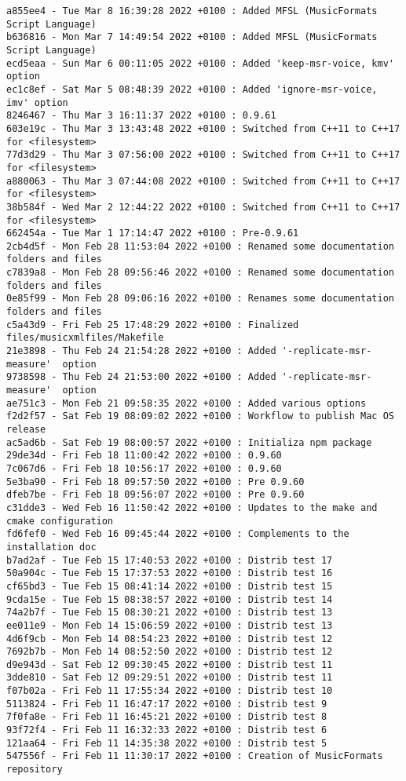 \begin{lstlisting}[language=Terminal]
a855ee4 - Tue Mar 8 16:39:28 2022 +0100 : Added MFSL (MusicFormats Script Language)
b636816 - Mon Mar 7 14:49:54 2022 +0100 : Added MFSL (MusicFormats Script Language)
ecd5eaa - Sun Mar 6 00:11:05 2022 +0100 : Added 'keep-msr-voice, kmv' option
ec1c8ef - Sat Mar 5 08:48:39 2022 +0100 : Added 'ignore-msr-voice, imv' option
8246467 - Thu Mar 3 16:11:37 2022 +0100 : 0.9.61
603e19c - Thu Mar 3 13:43:48 2022 +0100 : Switched from C++11 to C++17 for <filesystem>
77d3d29 - Thu Mar 3 07:56:00 2022 +0100 : Switched from C++11 to C++17 for <filesystem>
a880063 - Thu Mar 3 07:44:08 2022 +0100 : Switched from C++11 to C++17 for <filesystem>
38b584f - Wed Mar 2 12:44:22 2022 +0100 : Switched from C++11 to C++17 for <filesystem>
662454a - Tue Mar 1 17:14:47 2022 +0100 : Pre-0.9.61
2cb4d5f - Mon Feb 28 11:53:04 2022 +0100 : Renamed some documentation folders and files
c7839a8 - Mon Feb 28 09:56:46 2022 +0100 : Renamed some documentation folders and files
0e85f99 - Mon Feb 28 09:06:16 2022 +0100 : Renames some documentation folders and files
c5a43d9 - Fri Feb 25 17:48:29 2022 +0100 : Finalized files/musicxmlfiles/Makefile
21e3898 - Thu Feb 24 21:54:28 2022 +0100 : Added '-replicate-msr-measure'  option
9738598 - Thu Feb 24 21:53:00 2022 +0100 : Added '-replicate-msr-measure'  option
ae751c3 - Mon Feb 21 09:58:35 2022 +0100 : Added various options
f2d2f57 - Sat Feb 19 08:09:02 2022 +0100 : Workflow to publish Mac OS release
ac5ad6b - Sat Feb 19 08:00:57 2022 +0100 : Initializa npm package
29de34d - Fri Feb 18 11:00:42 2022 +0100 : 0.9.60
7c067d6 - Fri Feb 18 10:56:17 2022 +0100 : 0.9.60
5e3ba90 - Fri Feb 18 09:57:50 2022 +0100 : Pre 0.9.60
dfeb7be - Fri Feb 18 09:56:07 2022 +0100 : Pre 0.9.60
c31dde3 - Wed Feb 16 11:50:42 2022 +0100 : Updates to the make and cmake configuration
fd6fef0 - Wed Feb 16 09:45:44 2022 +0100 : Complements to the installation doc
b7ad2af - Tue Feb 15 17:40:53 2022 +0100 : Distrib test 17
50a904c - Tue Feb 15 17:37:53 2022 +0100 : Distrib test 16
cf65bd3 - Tue Feb 15 08:41:14 2022 +0100 : Distrib test 15
9cda15e - Tue Feb 15 08:38:57 2022 +0100 : Distrib test 14
74a2b7f - Tue Feb 15 08:30:21 2022 +0100 : Distrib test 13
ee011e9 - Mon Feb 14 15:06:59 2022 +0100 : Distrib test 13
4d6f9cb - Mon Feb 14 08:54:23 2022 +0100 : Distrib test 12
7692b7b - Mon Feb 14 08:52:50 2022 +0100 : Distrib test 12
d9e943d - Sat Feb 12 09:30:45 2022 +0100 : Distrib test 11
3dde810 - Sat Feb 12 09:29:51 2022 +0100 : Distrib test 11
f07b02a - Fri Feb 11 17:55:34 2022 +0100 : Distrib test 10
5113824 - Fri Feb 11 16:47:17 2022 +0100 : Distrib test 9
7f0fa8e - Fri Feb 11 16:45:21 2022 +0100 : Distrib test 8
93f72f4 - Fri Feb 11 16:32:33 2022 +0100 : Distrib test 6
121aa64 - Fri Feb 11 14:35:38 2022 +0100 : Distrib test 5
547556f - Fri Feb 11 11:30:17 2022 +0100 : Creation of MusicFormats repository
\end{lstlisting}

